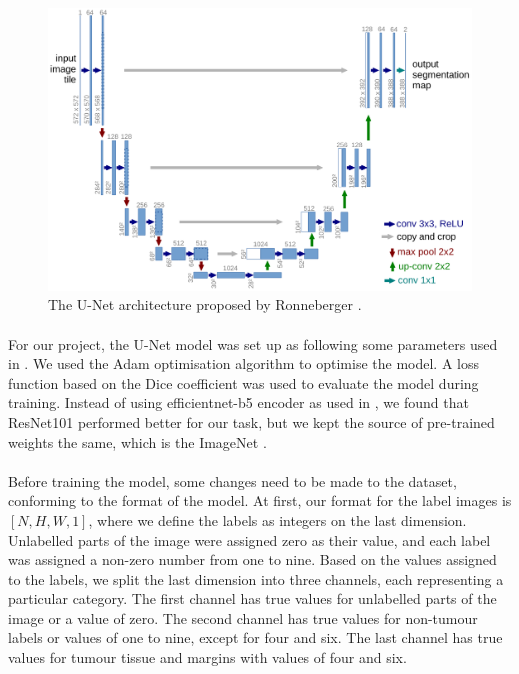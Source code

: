 \documentclass[12pt,oneside]{report}
\begin{document}
\begin{figure}[h]
\centering
\begin{minipage}[h]{0.9\textwidth}
    \centering
    \includegraphics[width=\textwidth]{figures/unet.png}
    \caption{The U-Net architecture proposed by Ronneberger \etal \cite{ronneberger_u-net_2015}.}
    \label{fig:unet}
\end{minipage}
\end{figure}

\paragraph{}
For our project, the U-Net model was set up as following some parameters used in \cite{seidlitz_robust_2022}. We used the Adam \cite{kingma_adam_2017} optimisation algorithm to optimise the model. A loss function based on the Dice coefficient \cite{dice_measures_1945} was used to evaluate the model during training. Instead of using efficientnet-b5 encoder \cite{tan_efficientnet_2020} as used in \cite{seidlitz_robust_2022}, we found that ResNet101 \cite{he_deep_2015} performed better for our task, but we kept the source of pre-trained weights the same, which is the ImageNet \cite{deng_imagenet_2009}.

\paragraph{}
Before training the model, some changes need to be made to the dataset, conforming to the format of the model. At first, our format for the label images is $[N, H, W, 1]$, where we define the labels as integers on the last dimension. Unlabelled parts of the image were assigned zero as their value, and each label was assigned a non-zero number from one to nine. Based on the values assigned to the labels, we split the last dimension into three channels, each representing a particular category. The first channel has true values for unlabelled parts of the image or a value of zero. The second channel has true values for non-tumour labels or values of one to nine, except for four and six. The last channel has true values for tumour tissue and margins with values of four and six.
\end{document}
